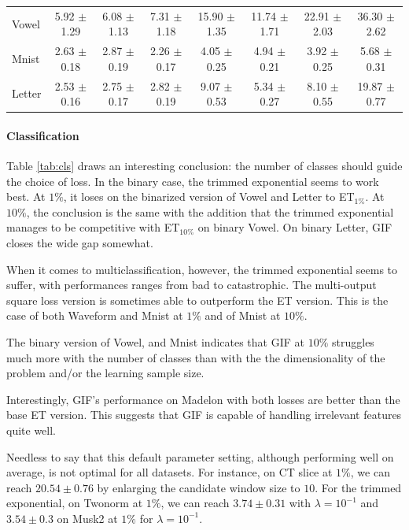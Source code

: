 \documentclass{article}
\newcommand{\bestA}{\cellcolor{orange}}
\newcommand{\bestB}{\cellcolor{dodgerblue}}
\begin{document}
\begin{table}[t]
\begin{center}
\begin{small}
\begin{sc}
\begin{tabular}{l|c|ccc|ccc}
Vowel & 5.92 $\pm$ 1.29 & \bestA 6.08 $\pm$ 1.13 & 7.31 $\pm$ 1.18 & 15.90 
$\pm$ 1.35 & \bestB 11.74 $\pm$ 1.71 & 22.91 $\pm$ 2.03 & 36.30 $\pm$ 2.62 \\
Mnist & 2.63 $\pm$ 0.18 & 2.87 $\pm$ 0.19 & \bestA 2.26 $\pm$ 0.17 & 4.05 $\pm$ 
0.25 & 4.94 $\pm$ 0.21 & \bestB 3.92 $\pm$ 0.25 & 5.68 $\pm$ 0.31 \\
Letter & 2.53 $\pm$ 0.16 & \bestA 2.75 $\pm$ 0.17 & 2.82 $\pm$ 0.19 & 9.07 
$\pm$ 0.53 & \bestB 5.34 $\pm$ 0.27 & 8.10 $\pm$ 0.55 & 19.87 $\pm$ 0.77 \\
\hline
\end{tabular}
\end{sc}
\end{small}
\end{center}
\vskip -0.1in
\end{table}


\paragraph{Classification}
Table \ref{tab:cls} draws an interesting conclusion: the number of classes 
should guide the choice of loss. In the binary case, the trimmed exponential 
seems to work best. At $1\%$, it loses on the binarized version of Vowel and 
Letter to ET$_{1\%}$. At $10\%$, the conclusion is the same with the addition 
that the trimmed exponential manages to be competitive with ET$_{10\%}$ on 
binary Vowel. On binary Letter, GIF closes the wide gap somewhat.

When it comes to multiclassification, however, the trimmed exponential seems to 
suffer, with performances ranges from bad to catastrophic. The multi-output 
square loss version is sometimes able to outperform the ET version. This is the 
case of both Waveform and Mnist at $1\%$ and of Mnist at $10\%$. 

The binary version of Vowel, and Mnist indicates that GIF at $10\%$ 
struggles much more with the number of classes than with the the dimensionality 
of the problem and/or the learning sample size. 

Interestingly, GIF's performance on Madelon with both losses are better than 
the base ET version. This suggests that GIF is capable of handling irrelevant 
features quite well.

Needless to say that this default parameter setting, although performing well 
on average, is not optimal for all datasets. For instance, on CT slice at 
$1\%$, we can reach $20.54 \pm 0.76$ by enlarging the candidate window size 
to $10$. 
For the trimmed exponential, on Twonorm at $1\%$, we can reach $3.74 \pm
0.31$ with $\lambda=10^{-1}$ and $3.54 \pm 0.3$ on Musk2 at $1\%$ for 
$\lambda=10^{-1}$.
\end{document}

